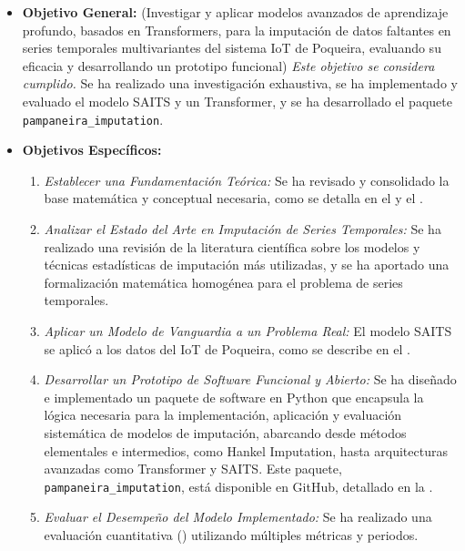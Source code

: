 \begin{itemize}
    \item \textbf{Objetivo General:} (Investigar y aplicar modelos avanzados de aprendizaje profundo, basados en Transformers, para la imputación de datos faltantes en series temporales multivariantes del sistema IoT de Poqueira, evaluando su eficacia y desarrollando un prototipo funcional)
    \textit{Este objetivo se considera cumplido.} Se ha realizado una investigación exhaustiva, se ha implementado y evaluado el modelo SAITS y un Transformer, y se ha desarrollado el paquete \texttt{pampaneira\_imputation}.
    \clearpage
     \item \textbf{Objetivos Específicos:}
     \begin{enumerate} 
        \item \textit{Establecer una Fundamentación Teórica:} Se ha revisado y consolidado la base matemática y conceptual necesaria, como se detalla en el  y el .
        \item \textit{Analizar el Estado del Arte en Imputación de Series Temporales:} Se ha realizado una revisión de la literatura científica sobre los modelos y técnicas estadísticas de imputación más utilizadas, y se ha aportado una formalización matemática homogénea para el problema de series temporales.
        
        \item \textit{Aplicar un Modelo de Vanguardia a un Problema Real:} El modelo SAITS se aplicó a los datos del IoT de Poqueira, como se describe en el .
        
        \item \textit{Desarrollar un Prototipo de Software Funcional y Abierto:} Se ha diseñado e implementado un paquete de software en Python que encapsula la lógica necesaria para la implementación, aplicación y evaluación sistemática de modelos de imputación, abarcando desde métodos elementales e intermedios, como Hankel Imputation,  hasta arquitecturas avanzadas como Transformer y SAITS. Este paquete, \texttt{pampaneira\_imputation}, está disponible en GitHub, detallado en la .
        
        \item \textit{Evaluar el Desempeño del Modelo Implementado:} Se ha realizado una evaluación cuantitativa () utilizando múltiples métricas y periodos.
    \end{enumerate}
\end{itemize}


